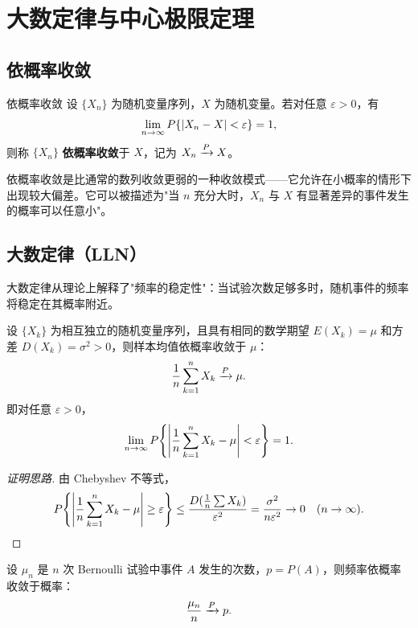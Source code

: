\chapter{大数定律与中心极限定理}


\section{依概率收敛}

\begin{mydefinition}{依概率收敛}
	设 $\{X_n\}$ 为随机变量序列，$X$ 为随机变量。若对任意 $\varepsilon > 0$，有
	\[\lim_{n \to \infty} P\{\left|X_n - X\right| < \varepsilon\} = 1,\]
	则称 $\{X_n\}$ \textbf{依概率收敛}于 $X$，记为 $X_n \xrightarrow{P} X$。
\end{mydefinition}

\begin{remark}
依概率收敛是比通常的数列收敛更弱的一种收敛模式——它允许在小概率的情形下出现较大偏差。它可以被描述为"当 $n$ 充分大时，$X_n$ 与 $X$ 有显著差异的事件发生的概率可以任意小"。
\end{remark}

\section{大数定律（LLN）}

大数定律从理论上解释了"频率的稳定性"：当试验次数足够多时，随机事件的频率将稳定在其概率附近。

\begin{theorem}
设 $\{X_k\}$ 为相互独立的随机变量序列，且具有相同的数学期望 $E(X_k) = \mu$ 和方差 $D(X_k) = \sigma^2 > 0$，则样本均值依概率收敛于 $\mu$：
\[\frac{1}{n} \sum_{k=1}^{n} X_k \xrightarrow{P} \mu.\]
即对任意 $\varepsilon > 0$，
\[\lim_{n \to \infty} P\!\left\{\left|\frac{1}{n} \sum_{k=1}^{n} X_k - \mu\right| < \varepsilon\right\} = 1.\]
\end{theorem}

\begin{proof}[证明思路]
由 Chebyshev 不等式，
\[P\!\left\{\left|\frac{1}{n}\sum_{k=1}^n X_k - \mu\right| \geq \varepsilon\right\} \leq \frac{D(\frac{1}{n}\sum X_k)}{\varepsilon^2} = \frac{\sigma^2}{n\varepsilon^2} \to 0 \quad (n \to \infty).\]
\end{proof}

\begin{theorem}
设 $\mu_n$ 是 $n$ 次 Bernoulli 试验中事件 $A$ 发生的次数，$p = P(A)$，则频率依概率收敛于概率：
\[\frac{\mu_n}{n} \xrightarrow{P} p.\]
\end{theorem}

